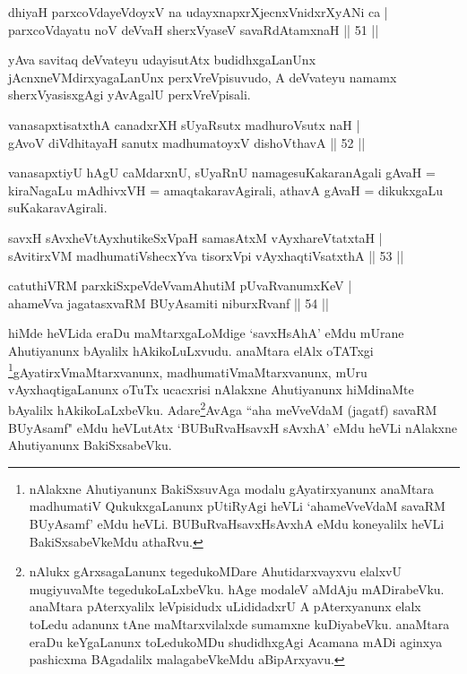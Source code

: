 
\begin{shl}
dhiyaH parxcoVdayeVdoyxV na udayxnapxrXjecnxVnidxrXyANi ca | \\
parxcoVdayatu noV deVvaH sherxVyaseV savaRdA\s \s tamxnaH \hfill|| 51 || 
\end{shl}

\begin{artha}
yAva savitaq deVvateyu udayisutAtx budidhxgaLanUnx\break 
jAcnxneVMdirxyagaLanUnx perxVreVpisuvudo, A deVvateyu namamx 
sherxVyasisxgAgi yAvAgalU perxVreVpisali.
\end{artha}


\begin{shl}
vanasapxtisatxthA canadxrXH sUyaRsutx madhuroV\s sutx naH | \\
gAvoV diVdhitayaH sanutx madhumatoyxV dishoV\s thavA  \hfill|| 52 || 
\end{shl}

\begin{artha}
vanasapxtiyU hAgU caMdarxnU, sUyaRnU namage\break suKakaranAgali gAvaH = 
kiraNagaLu mAdhivxVH = amaqtakaravAgirali, athavA gAvaH = dikukxgaLu 
suKakaravAgirali.
\end{artha}

\begin{shl}
savxH sAvxheVtAyxhutikeSxVpaH samasAtxM vAyxhareVtatxtaH | \\
sAvitirxVM madhumatiVshecxYva tisorxV\s pi vAyxhaqtiVsatxthA \hfill|| 53 || 
\end{shl}

\begin{shl}
catuthiVRM parxkiSxpeVdeVvamAhutiM pUvaRvanumxKeV | \\
ahameVva jagatasxvaRM BUyAsamiti niburxRvanf \hfill|| 54 || 
\end{shl}

\begin{artha}
hiMde heVLida eraDu maMtarxgaLoMdige `savxHsAhA' eMdu mUrane 
Ahutiyanunx bAyalilx hAkikoLuLxvudu. anaMtara elAlx oTATxgi 
\footnote{nAlakxne Ahutiyanunx BakiSxsuvAga modalu gAyatirxyanunx 
anaMtara madhumatiV QukukxgaLanunx pUtiRyAgi heVLi `ahameVveVdaM 
savaRM BUyAsamf' eMdu heVLi. BUBuRvaHsavxHsAvxhA eMdu koneyalilx heVLi 
BakiSxsabeVkeMdu athaRvu.}gAyatirxVmaMtarxvanunx, madhumatiVmaMtarxvanunx, mUru 
vAyxhaqtigaLanunx oTuTx ucacxrisi nAlakxne Ahutiyanunx hiMdinaMte 
bAyalilx hAkikoLaLxbeVku. Adare\footnote{nAlukx gArxsagaLanunx 
tegedukoMDare Ahutidarxvayxvu elalxvU mugiyuvaMte tegedukoLaLxbeVku. 
hAge modaleV aMdAju mADirabeVku. anaMtara pAterxyalilx leVpisidudx 
uLididadxrU A pAterxyanunx elalx toLedu adanunx tAne maMtarxvilalxde 
sumamxne kuDiyabeVku. anaMtara eraDu keYgaLanunx toLedukoMDu 
shudidhxgAgi Acamana mADi aginxya pashicxma BAgadalilx malagabeVkeMdu 
aBipArxyavu.}AvAga ``aha meVveVdaM 
(jagatf) savaRM BUyAsamf" eMdu heVLutAtx `BUBuRvaHsavxH sAvxhA' eMdu 
heVLi nAlakxne Ahutiyanunx BakiSxsabeVku.
\end{artha}

